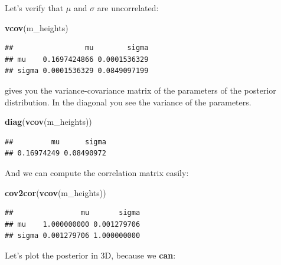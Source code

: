 \documentclass[
]{book}
\newenvironment{Shaded}{\begin{snugshade}}{\end{snugshade}}
\newcommand{\FunctionTok}[1]{\textcolor[rgb]{0.13,0.29,0.53}{\textbf{#1}}}
\newcommand{\NormalTok}[1]{#1}
\begin{document}
Let's verify that \(\mu\) and \(\sigma\) are uncorrelated:

\begin{Shaded}
\begin{Highlighting}[]
\FunctionTok{vcov}\NormalTok{(m\_heights)}
\end{Highlighting}
\end{Shaded}

\begin{verbatim}
##                 mu        sigma
## mu    0.1697424866 0.0001536329
## sigma 0.0001536329 0.0849097199
\end{verbatim}

gives you the variance-covariance matrix of the parameters of the posterior
distribution. In the diagonal you see the variance of the parameters.

\begin{Shaded}
\begin{Highlighting}[]
\FunctionTok{diag}\NormalTok{(}\FunctionTok{vcov}\NormalTok{(m\_heights))}
\end{Highlighting}
\end{Shaded}

\begin{verbatim}
##         mu      sigma 
## 0.16974249 0.08490972
\end{verbatim}

And we can compute the correlation matrix easily:

\begin{Shaded}
\begin{Highlighting}[]
\FunctionTok{cov2cor}\NormalTok{(}\FunctionTok{vcov}\NormalTok{(m\_heights))}
\end{Highlighting}
\end{Shaded}

\begin{verbatim}
##                mu       sigma
## mu    1.000000000 0.001279706
## sigma 0.001279706 1.000000000
\end{verbatim}

Let's plot the posterior in 3D, because we \textbf{can}:
\end{document}
